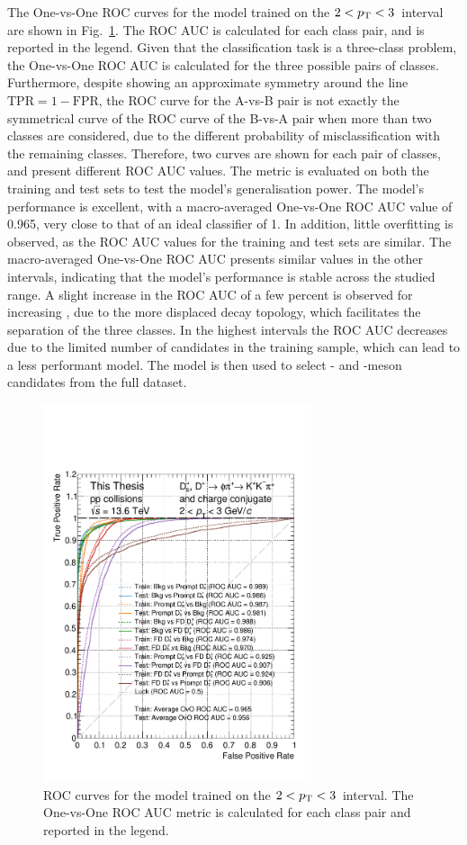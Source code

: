 The One-vs-One ROC curves for the model trained on the $2<p_\mathrm{T}<3$~\gevc interval are shown in Fig.~\ref{fig:ml_roc_curve}. The ROC AUC is calculated for each class pair, and is reported in the legend. Given that the classification task is a three-class problem, the One-vs-One ROC AUC is calculated for the three possible pairs of classes. Furthermore, despite showing an approximate symmetry around the line $\mathrm{TPR=1-FPR}$, the ROC curve for the A-vs-B pair is not exactly the symmetrical curve of the ROC curve of the B-vs-A pair when more than two classes are considered, due to the different probability of misclassification with the remaining classes. Therefore, two curves are shown for each pair of classes, and present different ROC AUC values. The metric is evaluated on both the training and test sets to test the model's generalisation power. The model's performance is excellent, with a macro-averaged One-vs-One ROC AUC value of 0.965, very close to that of an ideal classifier of 1. In addition, little overfitting is observed, as the ROC AUC values for the training and test sets are similar. The macro-averaged One-vs-One ROC AUC presents similar values in the other \pt intervals, indicating that the model's performance is stable across the studied \pt range. A slight increase in the ROC AUC of a few percent is observed for increasing \pt, due to the more displaced decay topology, which facilitates the separation of the three classes. In the highest \pt intervals the ROC AUC decreases due to the limited number of candidates in the training sample, which can lead to a less performant model. The model is then used to select \ds- and \dpl-meson candidates from the full dataset. 

\begin{figure}[htb]
    \centering
    \includegraphics[width=0.7\textwidth]{Figures/Chapter 5/ROC.pdf}
    \caption{ROC curves for the model trained on the $2<p_\mathrm{T}<3$~\gevc interval. The One-vs-One ROC AUC metric is calculated for each class pair and reported in the legend.}
    \label{fig:ml_roc_curve}
\end{figure}


